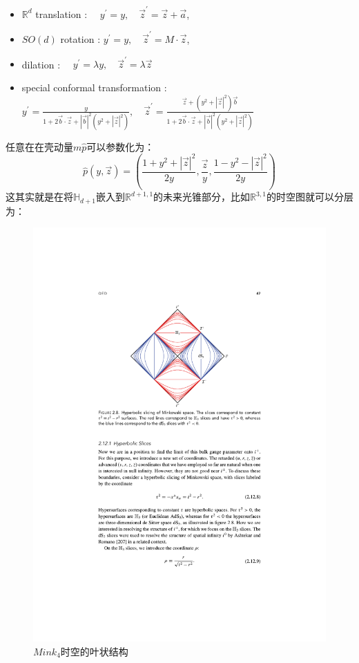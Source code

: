 \begin{itemize}
	\item $\mathbb{R}^d$ translation : $\quad y^{\prime}=y, \quad \vec{z}^{\prime}=\vec{z}+\vec{a}$,\\
	\item $S O(d)$ rotation : $y^{\prime}=y, \quad \vec{z}^{\prime}=M \cdot \vec{z}$,\\
	\item dilation : $\quad y^{\prime}=\lambda y, \quad \vec{z}^{\prime}=\lambda \vec{z}$\\
	\item special conformal transformation : $y^{\prime}=\frac{y}{1+2 \vec{b} \cdot \vec{z}+|\vec{b}|^2\left(y^2+|\vec{z}|^2\right)}, \quad \vec{z}^{\prime}=\frac{\vec{z}+\left(y^2+|\vec{z}|^2\right) \vec{b}}{1+2 \vec{b} \cdot \vec{z}+|\vec{b}|^2\left(y^2+|\vec{z}|^2\right)}$
\end{itemize}
任意在在壳动量$m\hat p$可以参数化为：
\begin{equation}
	\hat{p}(y,\vec{z})=\left(\frac{1+y^2+|\vec{z}|^2}{2y},\frac{\vec{z}}{y},\frac{1-y^2-|\vec{z}|^2}{2y}\right)
\end{equation}
这其实就是在将$\mathbb{H}_{d+1}$嵌入到$\mathbb{R}^{d+1,1}$的未来光锥部分，比如$\mathbb{R}^{3,1}$的时空图就可以分层为：
\begin{figure}[H]
	\centering 
	\includegraphics{figs/fig6.pdf}
	\caption{$Mink_4$时空的叶状结构}
\end{figure}
